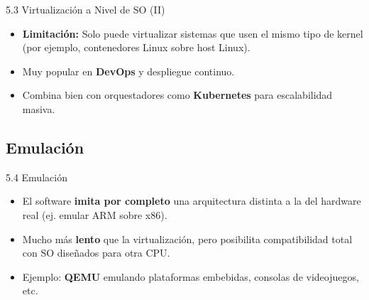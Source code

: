 \documentclass{beamer}
\begin{document}
\begin{frame}{5.3 Virtualización a Nivel de SO (II)}
    \begin{itemize}
        \item \textbf{Limitación:} Solo puede virtualizar sistemas que usen el mismo tipo de kernel (por ejemplo, contenedores Linux sobre host Linux).
        \item Muy popular en \textbf{DevOps} y despliegue continuo.
        \item Combina bien con orquestadores como \textbf{Kubernetes} para escalabilidad masiva.
    \end{itemize}
\end{frame}

\subsection{Emulación}
\begin{frame}{5.4 Emulación}
    \begin{itemize}
        \item El software \textbf{imita por completo} una arquitectura distinta a la del hardware real (ej. emular ARM sobre x86).
        \item Mucho más \textbf{lento} que la virtualización, pero posibilita compatibilidad total con SO diseñados para otra CPU.
        \item Ejemplo: \textbf{QEMU} emulando plataformas embebidas, consolas de videojuegos, etc.
    \end{itemize}
\end{frame}
\end{document}
